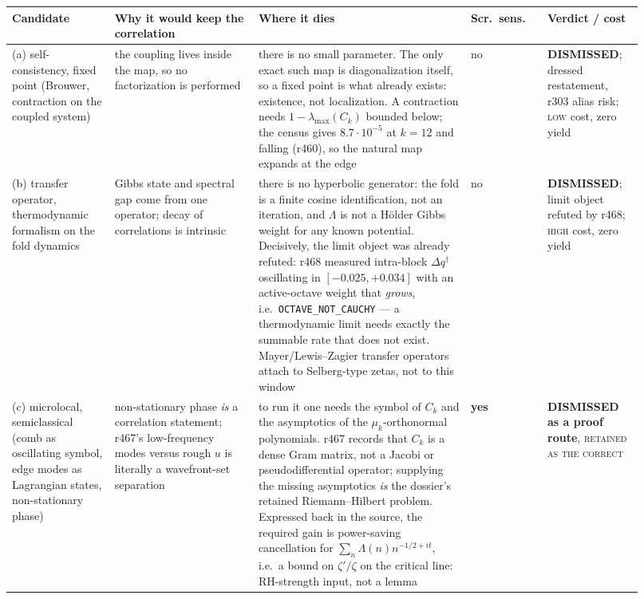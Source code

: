 \documentclass[11pt]{article}
\theoremstyle{remark}
\newcommand{\qdag}{q^{\dagger}}
\begin{document}
{\small
\begin{longtable}{@{}p{0.155\linewidth}p{0.215\linewidth}p{0.315\linewidth}p{0.085\linewidth}p{0.145\linewidth}@{}}
\toprule
Candidate & Why it would keep the correlation & Where it dies &
Scr.\ sens.\ & Verdict / cost\\
\midrule
\endhead
(a) self-consist\-ency, fixed point (Brouwer, contraction on the
coupled system) &
the coupling lives inside the map, so no factorization is performed &
there is no small parameter.  The only exact such map is
diagonalization itself, so a fixed point is what already exists:
existence, not localization.  A contraction needs
$1-\lambda_{\max}(C_k)$ bounded below; the census gives
$8.7\cdot10^{-5}$ at $k=12$ and falling (r460), so the natural map
expands at the edge &
no &
\textbf{DISMISSED}; dressed restatement, r303 alias risk;
\textsc{low} cost, zero yield\\
\addlinespace
(b) transfer operator, thermo\-dynamic formalism on the fold
dynamics &
Gibbs state and spectral gap come from one operator; decay of
correlations is intrinsic &
there is no hyperbolic generator: the fold is a finite cosine
identification, not an iteration, and $\Lambda$ is not a
H\"older Gibbs weight for any known potential.  Decisively, the
limit object was already refuted: r468 measured intra-block
$\Delta\qdag$ oscillating in $[-0.025,+0.034]$ with an active-octave
weight that \emph{grows}, i.e.\ \texttt{OCTAVE\_NOT\_CAUCHY} --- a
thermodynamic limit needs exactly the summable rate that does not
exist.  Mayer/Lewis--Zagier transfer operators attach to
Selberg-type zetas, not to this window &
no &
\textbf{DISMISSED}; limit object refuted by r468;
\textsc{high} cost, zero yield\\
\addlinespace
(c) micro\-local, semi\-classical (comb as oscillating symbol, edge
modes as Lagrangian states, non-stationary phase) &
non-stationary phase \emph{is} a correlation statement; r467's
low-frequency modes versus rough $u$ is literally a wavefront-set
separation &
to run it one needs the symbol of $C_k$ and the asymptotics of the
$\mu_k$-orthonormal polynomials.  r467 records that $C_k$ is a dense
Gram matrix, not a Jacobi or pseudodifferential operator; supplying
the missing asymptotics \emph{is} the dossier's retained
Riemann--Hilbert problem.  Expressed back in the source, the required
gain is power-saving cancellation for
$\sum_n\Lambda(n)n^{-1/2+it}$, i.e.\ a bound on $\zeta'/\zeta$ on the
critical line: RH-strength input, not a lemma &
\textbf{yes} &
\textbf{DISMISSED as a proof route}, \textsc{retained as the correct
}
\end{longtable}}
\end{document}
